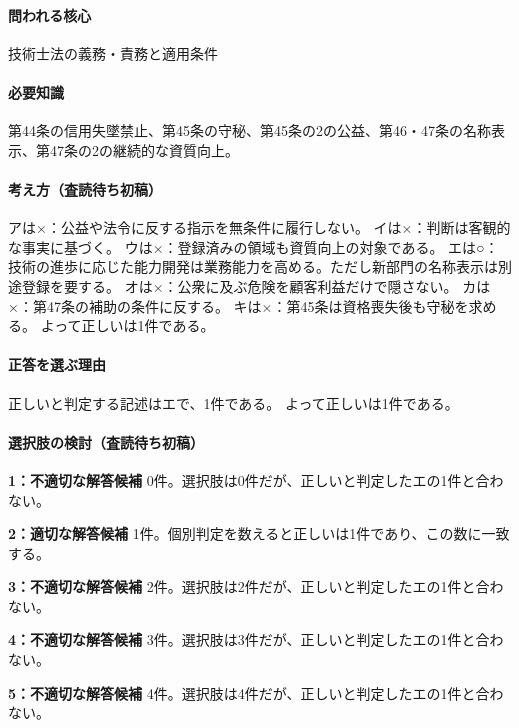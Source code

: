 \paragraph{問われる核心} 技術士法の義務・責務と適用条件

\paragraph{必要知識} 第44条の信用失墜禁止、第45条の守秘、第45条の2の公益、第46・47条の名称表示、第47条の2の継続的な資質向上。

\paragraph{考え方（査読待ち初稿）} アは×：公益や法令に反する指示を無条件に履行しない。 イは×：判断は客観的な事実に基づく。 ウは×：登録済みの領域も資質向上の対象である。 エは○：技術の進歩に応じた能力開発は業務能力を高める。ただし新部門の名称表示は別途登録を要する。 オは×：公衆に及ぶ危険を顧客利益だけで隠さない。 カは×：第47条の補助の条件に反する。 キは×：第45条は資格喪失後も守秘を求める。 よって正しいは1件である。

\paragraph{正答を選ぶ理由} 正しいと判定する記述はエで、1件である。  よって正しいは1件である。

\paragraph{選択肢の検討（査読待ち初稿）}\mbox{}\par

\noindent\textbf{1：不適切な解答候補} 0件。選択肢は0件だが、正しいと判定したエの1件と合わない。\par

\noindent\textbf{2：適切な解答候補} 1件。個別判定を数えると正しいは1件であり、この数に一致する。\par

\noindent\textbf{3：不適切な解答候補} 2件。選択肢は2件だが、正しいと判定したエの1件と合わない。\par

\noindent\textbf{4：不適切な解答候補} 3件。選択肢は3件だが、正しいと判定したエの1件と合わない。\par

\noindent\textbf{5：不適切な解答候補} 4件。選択肢は4件だが、正しいと判定したエの1件と合わない。\par

